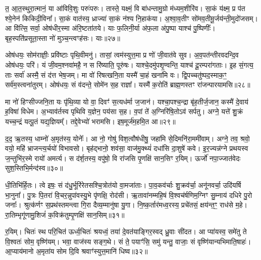 त॒ आ॒त॒स्थुरा॒त्मानं॒ या आ॑विवि॒शुः परुः॑परुः। तास्ते॒ यक्ष्मं॒ वि बा॑धन्तामु॒ग्रो म॑ध्यम॒शीरि॑व। सा॒कं य॑क्ष्म॒ प्र प॑त श्ये॒नेन॑ किकिदी॒विना᳚। सा॒कं वात॑स्य॒ ध्राज्या॑ सा॒कं न॑श्य नि॒हाक॑या। अ॒श्वा॒व॒तीꣳ सो॑मव॒तीमू॒र्जय॑न्ती॒\-मुदो॑जसम्। आ वि॑त्सि॒ सर्वा॒ ओष॑धीर॒स्मा अ॑रि॒ष्टता॑तये। याः फ॒लिनी॒र्या अ॑फ॒ला अ॑पु॒ष्पा याश्च॑ पु॒ष्पिणीः᳚। बृह॒स्पति॑प्रसूता॒स्ता नो॑ मुञ्च॒न्त्वꣳह॑सः। याः॥२७॥

ओष॑धयः॒ सोम॑राज्ञीः॒ प्रवि॑ष्टाः पृथि॒वीमनु॑। तासां॒ त्वम॑स्युत्त॒मा प्र णो॑ जी॒वात॑वे सुव। अ॒व॒पत॑न्तीरवदन्दि॒व ओष॑धयः॒ परि॑। यं जी॒वम॒श्नवा॑महै॒ न स रि॑ष्याति॒ पूरु॑षः। याश्चे॒दमु॑पशृ॒ण्वन्ति॒ याश्च॑ दू॒रम्परा॑गताः। इ॒ह सं॒गत्य॒ ताः सर्वा॑ अस्मै॒ सं द॑त्त भेष॒जम्। मा वो॑ रिषत्खनि॒ता यस्मै॑ चा॒हं खना॑मि वः। द्वि॒पच्चतु॑ष्पद॒स्माक॒ꣳ॒ सर्व॑म॒स्त्वना॑तुरम्। ओष॑धयः॒ सं व॑दन्ते॒ सोमे॑न स॒ह राज्ञा᳚। यस्मै॑ क॒रोति॑ ब्राह्म॒णस्तꣳ रा॑जन्पारयामसि॥२८॥

{\anuvakamend[{रपः॑ पत॒त्रिणी॒र्या अꣳह॑सो॒ याः खना॑मि वो॒\-ऽष्टाद॑श च॥६॥}]}

मा नो॑ हिꣳसीज्जनि॒ता यः पृ॑थि॒व्या यो वा॒ दिवꣳ॑ स॒त्यध॑र्मा ज॒जान॑। यश्चा॒पश्च॒न्द्रा बृ॑ह॒तीर्ज॒जान॒ कस्मै॑ दे॒वाय॑ ह॒विषा॑ विधेम। अ॒भ्याव॑र्तस्व पृथिवि य॒ज्ञेन॒ पय॑सा स॒ह। व॒पां ते॑ अ॒ग्निरि॑षि॒तो\-ऽव॑ सर्पतु। अग्ने॒ यत्ते॑ शु॒क्रं यच्च॒न्द्रं यत्पू॒तं यद्य॒ज्ञियम्᳚। तद्दे॒वेभ्यो॑ भरामसि। इष॒मूर्ज॑म॒हमि॒त आ॥२९॥

द॒द॒ ऋ॒तस्य॒ धाम्नो॑ अ॒मृत॑स्य॒ योनेः᳚। आ नो॒ गोषु॑ विश॒त्वौष॑धीषु॒ जहा॑मि से॒दिमनि॑रा॒ममी॑वाम्। अग्ने॒ तव॒ श्रवो॒ वयो॒ महि॑ भ्राजन्त्य॒र्चयो॑ विभावसो। बृह॑द्भानो॒ शव॑सा॒ वाज॑मु॒क्थ्यं॑ दधा॑सि दा॒शुषे॑ कवे। इ॒र॒ज्यन्न॑ग्ने प्रथयस्व ज॒न्तुभि॑र॒स्मे रायो॑ अमर्त्य। स द॑र्\mbox{}श॒तस्य॒ वपु॑षो॒ वि रा॑जसि पृ॒णक्षि॑ सान॒सिꣳ र॒यिम्। ऊर्जो॑ नपा॒ज्जात॑वेदः सुश॒स्तिभि॒र्मन्द॑स्व॥३०॥

धी॒तिभि॑र्हि॒तः। त्वे इषः॒ सं द॑धु॒र्भूरि॑रेतसश्चि॒त्रोत॑यो वा॒मजा॑ताः। पा॒व॒कव॑र्चाः शु॒क्रव॑र्चा॒ अनू॑नवर्चा॒ उदि॑यर्\mbox{}षि भा॒नुना᳚। पु॒त्रः पि॒तरा॑ वि॒चर॒न्नुपा॑वस्यु॒भे पृ॑णक्षि॒ रोद॑सी। ऋ॒तावा॑नम्महि॒षं वि॒श्वच॑र्\mbox{}षणिम॒ग्निꣳ सु॒म्नाय॑ दधिरे पु॒रो जनाः᳚। श्रुत्क॑र्णꣳ स॒प्रथ॑स्तमन्त्वा गि॒रा दैव्य॒म्मानु॑षा यु॒गा। नि॒ष्क॒र्तार॑मध्व॒रस्य॒ प्रचे॑तसं॒ क्षय॑न्त॒ꣳ॒ राध॑से म॒हे। रा॒तिम्भृगू॑णामु॒शिजं॑ क॒विक्र॑तुम्पृ॒णक्षि॑ सान॒सिम्॥३१॥

र॒यिम्। चितः॑ स्थ परि॒चित॑ ऊर्ध्व॒चितः॑ श्रयध्वं॒ तया॑ दे॒वत॑याङ्गिर॒स्वद् ध्रु॒वाः सी॑दत। आ प्या॑यस्व॒ समे॑तु ते वि॒श्वतः॑ सोम॒ वृष्णि॑यम्। भवा॒ वाज॑स्य सङ्ग॒थे। सं ते॒ पयाꣳ॑सि॒ समु॑ यन्तु॒ वाजाः॒ सं वृष्णि॑यान्यभिमाति॒षाहः॑। आ॒प्याय॑मानो अ॒मृता॑य सोम दि॒वि श्रवाꣳ॑स्युत्त॒मानि॑ धिष्व॥३२॥

